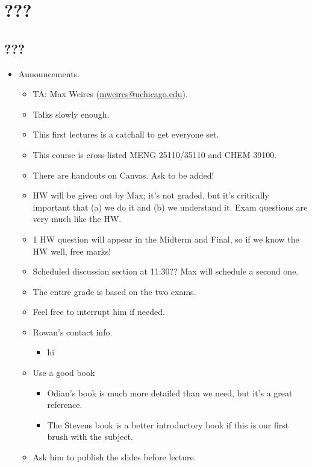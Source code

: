 \documentclass[../notes.tex]{subfiles}
\begin{document}
\chapter{???}
\section{???}
\begin{itemize}
    \item {}Announcements.
    \begin{itemize}
        \item TA: Max Weires (\href{mailto:mweires@uchicago.edu}{mweires@uchicago.edu}).
        \item Talks slowly enough.
        \item This first lectures is a catchall to get everyone set.
        \item This course is cross-listed MENG 25110/35110 and CHEM 39100.
        \item There are handouts on Canvas. Ask to be added!
        \item HW will be given out by Max; it's not graded, but it's critically important that (a) we do it and (b) we understand it. Exam questions are very much like the HW.
        \item 1 HW question will appear in the Midterm and Final, so if we know the HW well, free marks!
        \item Scheduled discussion section at 11:30?? Max will schedule a second one.
        \item The entire grade is based on the two exams.
        \item Feel free to interrupt him if needed.
        \item Rowan's contact info.
        \begin{itemize}
            \item hi
        \end{itemize}
        \item Use a good book
        \begin{itemize}
            \item Odian's book is much more detailed than we need, but it's a great reference.
            \item The Stevens book is a better introductory book if this is our first brush with the subject.
        \end{itemize}
        \item Ask him to publish the slides before lecture.
    \end{itemize}

\end{itemize}
\end{document}
